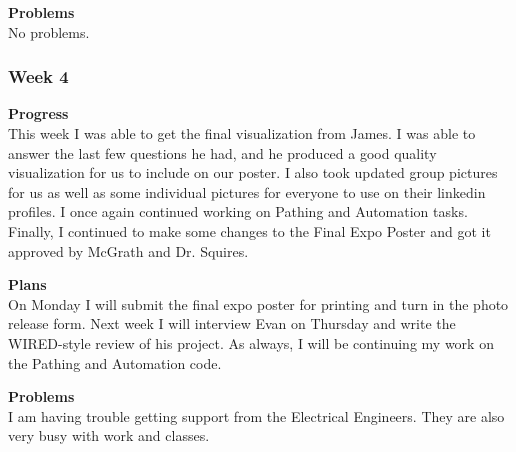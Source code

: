 \textbf{Problems} \\
No problems.

\subsubsection{Week 4}
\textbf{Progress} \\ 
This week I was able to get the final visualization from James. I was able to answer the last few questions he had, and he produced a good quality visualization for us to include on our poster. I also took updated group pictures for us as well as some individual pictures for everyone to use on their linkedin profiles. I once again continued working on Pathing and Automation tasks. Finally, I continued to make some changes to the Final Expo Poster and got it approved by McGrath and Dr. Squires.

\textbf{Plans} \\ 
On Monday I will submit the final expo poster for printing and turn in the photo release form. Next week I will interview Evan on Thursday and write the WIRED-style review of his project. As always, I will be continuing my work on the Pathing and Automation code.

\textbf{Problems} \\ 
I am having trouble getting support from the Electrical Engineers. They are also very busy with work and classes.

